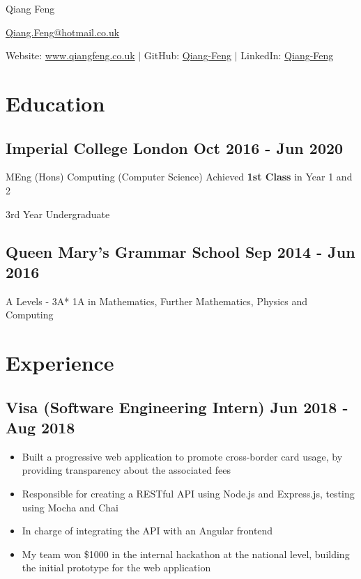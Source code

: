 \documentclass[a4paper]{article}
\begin{document}
\begin{center}
    {\huge Qiang Feng}

    \vspace{2pt}

    \href{mailto:Qiang.Feng@hotmail.co.uk}{Qiang.Feng@hotmail.co.uk}

    \vspace{2pt}

    Website: \href{https://www.qiangfeng.co.uk}{www.qiangfeng.co.uk} $\mid$
    GitHub: \href{https://github.com/Qiang-Feng}{Qiang-Feng} $\mid$
    LinkedIn: \href{https://www.linkedin.com/in/qiang-feng/}{Qiang-Feng}
\end{center}

\section*{Education}

\subsection*{Imperial College London \hfill Oct 2016 - Jun 2020}

MEng (Hons) Computing (Computer Science) \hfill Achieved \textbf{1st Class} in Year 1 and 2

3rd Year Undergraduate

\subsection*{Queen Mary's Grammar School \hfill Sep 2014 - Jun 2016}

A Levels - 3A* 1A in Mathematics, Further Mathematics, Physics and Computing

\section*{Experience}

\subsection*{Visa \textnormal{(Software Engineering Intern)} \hfill Jun 2018 - Aug 2018}

\begin{itemize}
    \item Built a progressive web application to promote cross-border card usage, by providing transparency about the associated fees
    \item Responsible for creating a RESTful API using Node.js and Express.js, testing using Mocha and Chai
    \item In charge of integrating the API with an Angular frontend
    \item My team won \$1000 in the internal hackathon at the national level, building the initial prototype for the web application
\end{itemize}
\end{document}

